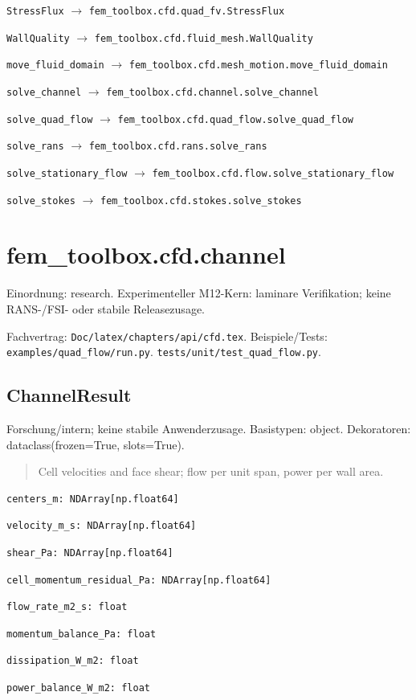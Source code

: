 \noindent\nolinkurl{StressFlux} $\to$ \nolinkurl{fem_toolbox.cfd.quad_fv.StressFlux}\par
\noindent\nolinkurl{WallQuality} $\to$ \nolinkurl{fem_toolbox.cfd.fluid_mesh.WallQuality}\par
\noindent\nolinkurl{move_fluid_domain} $\to$ \nolinkurl{fem_toolbox.cfd.mesh_motion.move_fluid_domain}\par
\noindent\nolinkurl{solve_channel} $\to$ \nolinkurl{fem_toolbox.cfd.channel.solve_channel}\par
\noindent\nolinkurl{solve_quad_flow} $\to$ \nolinkurl{fem_toolbox.cfd.quad_flow.solve_quad_flow}\par
\noindent\nolinkurl{solve_rans} $\to$ \nolinkurl{fem_toolbox.cfd.rans.solve_rans}\par
\noindent\nolinkurl{solve_stationary_flow} $\to$ \nolinkurl{fem_toolbox.cfd.flow.solve_stationary_flow}\par
\noindent\nolinkurl{solve_stokes} $\to$ \nolinkurl{fem_toolbox.cfd.stokes.solve_stokes}\par
\section{fem\_toolbox.cfd.channel}
Einordnung: research. Experimenteller M12-Kern: laminare Verifikation; keine RANS-/FSI- oder stabile Releasezusage.
\par Fachvertrag: \nolinkurl{Doc/latex/chapters/api/cfd.tex}. Beispiele/Tests:
\nolinkurl{examples/quad_flow/run.py}.
\nolinkurl{tests/unit/test_quad_flow.py}.
\subsection{ChannelResult}
Forschung/intern; keine stabile Anwenderzusage.
Basistypen: object. Dekoratoren: dataclass(frozen=True, slots=True).
\begin{quote}
Cell velocities and face shear; flow per unit span, power per wall area.
\end{quote}
\begin{lstlisting}
centers_m: NDArray[np.float64]
\end{lstlisting}
\begin{lstlisting}
velocity_m_s: NDArray[np.float64]
\end{lstlisting}
\begin{lstlisting}
shear_Pa: NDArray[np.float64]
\end{lstlisting}
\begin{lstlisting}
cell_momentum_residual_Pa: NDArray[np.float64]
\end{lstlisting}
\begin{lstlisting}
flow_rate_m2_s: float
\end{lstlisting}
\begin{lstlisting}
momentum_balance_Pa: float
\end{lstlisting}
\begin{lstlisting}
dissipation_W_m2: float
\end{lstlisting}
\begin{lstlisting}
power_balance_W_m2: float
\end{lstlisting}

